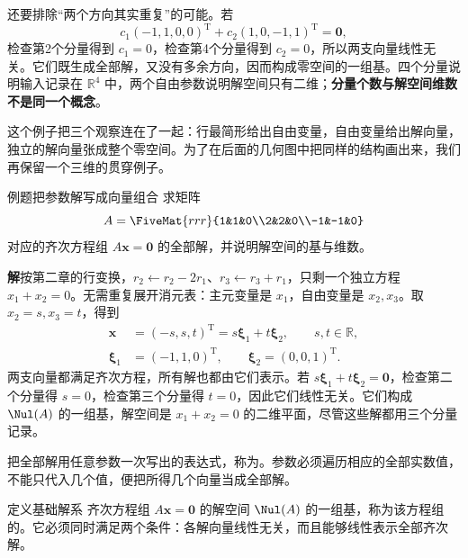 \documentclass[a4paper,12pt,twoside,openany,fontset=none]{ctexbook}
\newcounter{definition}[chapter]
\newenvironment{definition}[1][]{\begin{defBox}{定义}{#1}}{\end{defBox}}
\newcounter{example}[chapter]
\newenvironment{example}[1][]{\begin{exBox}{例题}{#1}}{\end{exBox}}
\numberwithin{equation}{chapter}
\begin{document}
还要排除“两个方向其实重复”的可能。若
\begin{equation}
 c_1(-1,1,0,0)^{\mathrm T}+c_2(1,0,-1,1)^{\mathrm T}
 =\boldsymbol0,
\end{equation}
检查第2个分量得到 $c_1=0$，检查第4个分量得到 $c_2=0$，所以两支向量线性无关。它们既生成全部解，又没有多余方向，因而构成零空间的一组基。四个分量说明输入记录在 $\mathbb R^4$ 中，两个自由参数说明解空间只有二维；\textbf{分量个数与解空间维数不是同一个概念}。

这个例子把三个观察连在了一起：行最简形给出自由变量，自由变量给出解向量，独立的解向量张成整个零空间。为了在后面的几何图中把同样的结构画出来，我们再保留一个三维的贯穿例子。

\begin{example}[把参数解写成向量组合]
求矩阵
\begin{equation}
 A=\FiveMat{rrr}{1&1&0\\2&2&0\\-1&-1&0}
 \label{eq:five-running-A}
\end{equation}
对应的齐次方程组 $A\boldsymbol x=\boldsymbol0$ 的全部解，并说明解空间的基与维数。
\end{example}
\textbf{解}\quad 按第二章的行变换，$r_2\leftarrow r_2-2r_1$、$r_3\leftarrow r_3+r_1$，只剩一个独立方程 $x_1+x_2=0$。无需重复展开消元表：主元变量是 $x_1$，自由变量是 $x_2,x_3$。取 $x_2=s,x_3=t$，得到
\begin{align}
 \boldsymbol x&=(-s,s,t)^{\mathrm T}
 =s\boldsymbol\xi_1+t\boldsymbol\xi_2,\qquad s,t\in\mathbb R,\\
 \boldsymbol\xi_1&=(-1,1,0)^{\mathrm T},\qquad
 \boldsymbol\xi_2=(0,0,1)^{\mathrm T}.
 \label{eq:five-running-basis}
\end{align}
两支向量都满足齐次方程，所有解也都由它们表示。若 $s\boldsymbol\xi_1+t\boldsymbol\xi_2=\boldsymbol0$，检查第二个分量得 $s=0$，检查第三个分量得 $t=0$，因此它们线性无关。它们构成 $\Nul(A)$ 的一组基，解空间是 $x_1+x_2=0$ 的二维平面，尽管这些解都用三个分量记录。

把全部解用任意参数一次写出的表达式，称为。参数必须遍历相应的全部实数值，不能只代入几个值，便把所得几个向量当成全部解。

\begin{definition}[基础解系]
齐次方程组 $A\boldsymbol x=\boldsymbol0$ 的解空间 $\Nul(A)$ 的一组基，称为该方程组的。它必须同时满足两个条件：各解向量线性无关，而且能够线性表示全部齐次解。
\end{definition}
\end{document}
